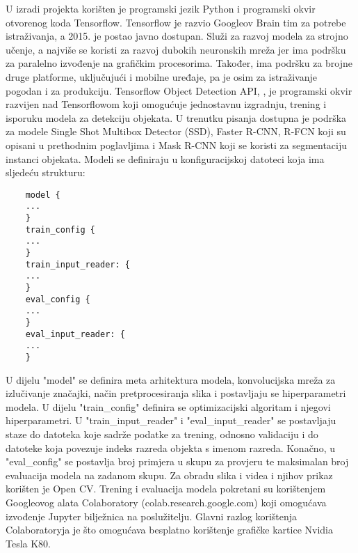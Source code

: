 U izradi projekta korišten je programski jezik Python i programski okvir otvorenog koda Tensorflow. Tensorflow je razvio Googleov Brain tim za potrebe istraživanja, a 2015. je postao javno dostupan. Služi za razvoj modela za strojno učenje, a najviše se koristi za razvoj dubokih neuronskih mreža jer ima podršku za paralelno izvođenje na grafičkim procesorima. Također, ima podršku za brojne druge platforme, uključujući i mobilne uređaje, pa je osim za istraživanje pogodan i za produkciju. Tensorflow Object Detection API, \cite{DBLP:journals/corr/HuangRSZKFFWSG016}, je programski okvir razvijen nad Tensorflowom koji omogućuje jednostavnu izgradnju, trening i isporuku modela za detekciju objekata. U trenutku pisanja dostupna je podrška za modele Single Shot Multibox Detector (SSD), Faster R-CNN, R-FCN koji su opisani u prethodnim poglavljima i Mask R-CNN koji se koristi za segmentaciju instanci objekata. Modeli se definiraju u konfiguracijskoj datoteci koja ima sljedeću strukturu:
\begin{lstlisting}
	model {
	...
	}
	train_config {
	...
	}
	train_input_reader: {
	...
	}
	eval_config {
	...
	}
	eval_input_reader: {
	...
	}
\end{lstlisting}
U dijelu "model" se definira meta arhitektura modela, konvolucijska mreža za izlučivanje značajki, način pretprocesiranja slika i postavljaju se hiperparametri modela. U dijelu "train\_config" definira se optimizacijski algoritam i njegovi hiperparametri. U "train\_input\_reader" i "eval\_input\_reader" se postavljaju staze do datoteka koje sadrže podatke za trening, odnosno validaciju i do datoteke koja povezuje indeks razreda objekta s imenom razreda. Konačno, u "eval\_config" se postavlja broj primjera u skupu za provjeru te maksimalan broj evaluacija modela na zadanom skupu.
Za obradu slika i videa i njihov prikaz korišten je Open CV.
Trening i evaluacija modela pokretani su korištenjem Googleovog alata Colaboratory (colab.research.google.com) koji omogućava izvođenje Jupyter bilježnica na poslužitelju. Glavni razlog korištenja Colaboratoryja je što omogućava besplatno korištenje grafičke kartice Nvidia Tesla K80. 